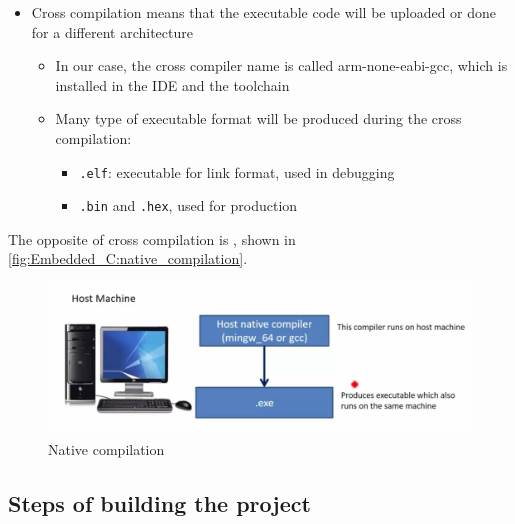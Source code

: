 \begin{itemize}
    \item Cross compilation means that the executable code will be uploaded or done for a different architecture
    
    \begin{itemize}
        \item In our case, the cross compiler name is called arm-none-eabi-gcc, which is installed in the IDE and the toolchain
        
        \item Many type of executable format will be produced during the cross compilation:
        
        \begin{itemize}
            \item \verb|.elf|: executable for link format, used in debugging
            
            \item \verb|.bin| and \verb|.hex|, used for production
        \end{itemize}
        
        
    \end{itemize}
    
\end{itemize}


The opposite of cross compilation is , shown in \autoref{fig:Embedded_C:native_compilation}.

\begin{figure}[h]
\centering
\includegraphics[scale=0.5]{Figures/Embedded_C/native_compilation}
\caption{Native compilation}
\label{fig:Embedded_C:native_compilation}
\end{figure} 


\subsection{Steps of building the project}
\label{SubSec:Steps_building_project}

